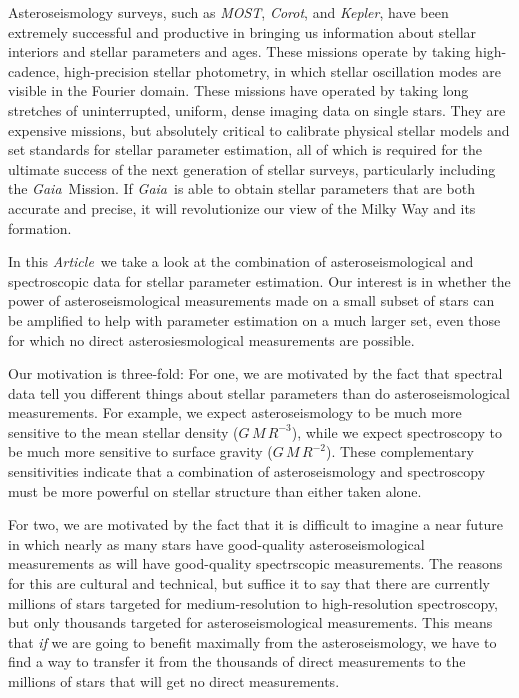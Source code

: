 \documentclass[12pt, preprint]{aastex}
\newcommand{\project}[1]{\textsl{#1}}
\newcommand{\corot}{\project{Corot}}
\newcommand{\kepler}{\project{Kepler}}
\newcommand{\gaia}{\project{Gaia}}
\newcommand{\most}{\project{MOST}}
\newcommand{\documentname}{\textsl{Article}}
\begin{document}
Asteroseismology surveys, such as \most, \corot, and \kepler, have
been extremely successful and productive in bringing us information
about stellar interiors and stellar parameters and ages.
These missions operate by taking high-cadence, high-precision stellar
photometry, in which stellar oscillation modes are visible in the
Fourier domain.
These missions have operated by taking long stretches of
uninterrupted, uniform, dense imaging data on single stars.
They are expensive missions, but absolutely critical to calibrate
physical stellar models and set standards for stellar parameter
estimation, all of which is required for the ultimate success of the
next generation of stellar surveys, particularly including the
\gaia\ Mission.
If \gaia\ is able to obtain stellar parameters that are both accurate
and precise, it will revolutionize our view of the Milky Way and its
formation.

In this \documentname\ we take a look at the combination of
asteroseismological and spectroscopic data for stellar parameter
estimation.
Our interest is in whether the power of asteroseismological
measurements made on a small subset of stars can be amplified to help
with parameter estimation on a much larger set, even those for which
no direct asterosiesmological measurements are possible.

Our motivation is three-fold:
For one, we are motivated by the fact that spectral data tell you
different things about stellar parameters than do asteroseismological
measurements.
For example, we expect asteroseismology to be much more sensitive
to the mean stellar density ($G\,M\,R^{-3}$), while we expect spectroscopy to be much
more sensitive to surface gravity ($G\,M\,R^{-2}$).
These complementary sensitivities indicate that a combination of
asteroseismology and spectroscopy must be more powerful on stellar
structure than either taken alone.

For two, we are motivated by the fact that it is difficult to imagine
a near future in which nearly as many stars have good-quality
asteroseismological measurements as will have good-quality
spectrscopic measurements.
The reasons for this are cultural and technical, but suffice it to say
that there are currently millions of stars targeted for
medium-resolution to high-resolution spectroscopy, but only thousands
targeted for asteroseismological measurements.
This means that \emph{if} we are going to benefit maximally from the
asteroseismology, we have to find a way to transfer it from the thousands
of direct measurements to the millions of stars that will get no direct
measurements.
\end{document}
